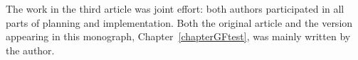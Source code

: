 The work in the third article \cite{listenmaa_claessen2018} was joint effort: both authors participated in all parts of planning and implementation. Both the original article and the version appearing in this monograph, Chapter~\ref{chapterGFtest}, was mainly written by the author.


